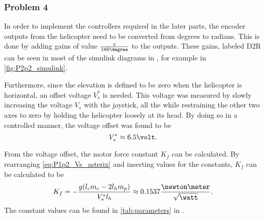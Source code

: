\subsubsection{Problem 4}
In order to implement the controllers required in the later parts, the encoder outputs from the helicopter need to be converted from degrees to radians. This is done by adding gains of value $\frac{\pi}{180\degree}$ to the outputs. These gains, labeled D2R can be seen in most of the simulink diagrams in , for example in \cref{fig:P2p2_simulink}.

Furthermore, since the elevation is defined to be zero when the helicopter is horizontal, an offset voltage $V_s^*$ is needed. This voltage was measured by slowly increasing the voltage $V_s$ with the joystick, all the while restraining the other two axes to zero by holding the helicopter loosely at its head. By doing so in a controlled manner, the voltage offset was found to be 
\begin{equation}
    \label{eq:P1_Vs_asterix_value}
    V_s^* \approx 6.5 \volt.
\end{equation}

From the voltage offset, the motor force constant $K_f$ can be calculated. By rearranging \cref{eq:P1p2_Vs_asterix} and inserting values for the constants, $K_f$ can be calculated to be
\begin{equation}
    K_f = -\frac{g(l_c m_c - 2 l_h m_p)}{V_s^* l_h} \approx 0.1537 \frac{\newton \meter}{\sqrt{\watt}}.
\end{equation}
The constant values can be found in \cref{tab:parameters} in .
